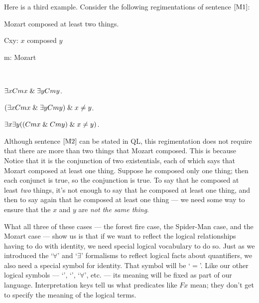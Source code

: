 Here is a third example. 
Consider the following regimentations of sentence $\ref{M1}$:

\begin{earg}
  \item[\ex{M1}] Mozart composed at least two things.
\end{earg}

\begin{multicols}{2}

\begin{ekey}
  \item[Cxy:] $x$ composed $y$
  \item[m:] Mozart
  \item[] ~
\end{ekey}

\begin{earg}
  \item[\ex{M2}] $\exists x Cmx \mathrel\& \exists y Cmy$.
  \item[\ex{M3}] $(\exists x Cmx \mathrel\& \exists y Cmy) \mathrel\& x\neq y$.
  \item[\ex{M4}] $\exists x\exists y((Cmx \mathrel\& Cmy) \mathrel\& x\neq y)$.
\end{earg}

\end{multicols}

Although sentence $\ref{M2}$ can be stated in QL, this regimentation does not require that there are more than two things that Mozart composed.
This is because 
Notice that it is the conjunction of two existentials, each of which says that Mozart composed at least one thing.
Suppose he composed only one thing; then each conjunct is true, so the conjunction is true.
To say that he composed at least \emph{two} things, it's not enough to say that he composed at least one thing, and then to say again that he composed at least one thing --- we need some way to ensure that the $x$ and $y$ are \emph{not the same thing}.

What all three of these cases --- the forest fire case, the Spider-Man case, and the Mozart case --- show us is that if we want to reflect the logical relationships having to do with identity, we need special logical vocabulary to do so. Just as we introduced the `$\forall$' and `$\exists$' formalisms to reflect logical facts about quantifiers, we also need a special symbol for identity. That symbol will be `$=$'. Like our other logical symbols --- `\eif', `\enot', `$\forall$', etc. --- its meaning will be fixed as part of our language. Interpretation keys tell us what predicates like $Fx$ mean; they don't get to specify the meaning of the logical terms.

